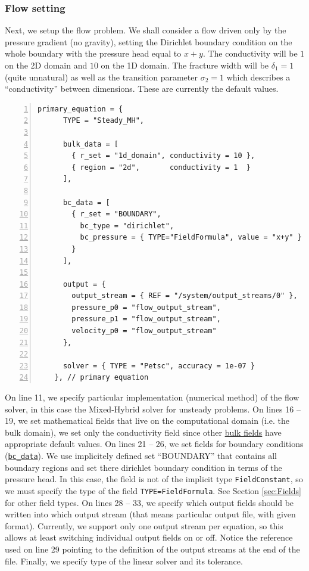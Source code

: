 \documentclass[12pt,a4paper]{report}
\begin{document}
\subsubsection{Flow setting}
Next, we setup the flow problem. We shall consider a flow driven only by the pressure gradient (no gravity),
setting the Dirichlet boundary condition on the whole boundary with the pressure head equal to $x+y$. 
The conductivity will be $1$ on the 2D domain and $10$ on the 1D domain.
The fracture width will be $\delta_1=1$ (quite unnatural) as well as the transition parameter 
$\sigma_2 = 1$ which describes a ``conductivity'' between dimensions. 
These are currently the default values.

\begin{Verbatim}[numbers=left, firstnumber=last]
    primary_equation = {
      TYPE = "Steady_MH", 

      bulk_data = [
        { r_set = "1d_domain", conductivity = 10 },
        { region = "2d",       conductivity = 1  }
      ],
      
      bc_data = [
        { r_set = "BOUNDARY",
          bc_type = "dirichlet",
          bc_pressure = { TYPE="FieldFormula", value = "x+y" }
        }
      ],

      output = {
        output_stream = { REF = "/system/output_streams/0" }, 
        pressure_p0 = "flow_output_stream", 
        pressure_p1 = "flow_output_stream", 
        velocity_p0 = "flow_output_stream"
      }, 
      
      solver = { TYPE = "Petsc", accuracy = 1e-07 }
    }, // primary equation
\end{Verbatim}
On line 11, we specify particular implementation (numerical method) of the flow solver, in this case the Mixed-Hybrid
solver for unsteady problems. On lines 16 -- 19, we set mathematical fields that live on the computational domain 
(i.e. the bulk domain), we set only the conductivity field since other \hyperlink{IT::DarcyFlowMH-Steady-BulkData}{bulk fields} have appropriate default values.
On lines 21 -- 26, we set fields for boundary conditions (\hyperlink{IT::DarcyFlowMH-Steady-BulkData}{{\tt bc\_data}}). 
We use implicitely defined set ``BOUNDARY'' that contains all boundary regions and set there dirichlet boundary condition in terms of the 
pressure head. In this case, the field is not of the implicit type {\tt FieldConstant}, so we must specify the type of the field {\tt TYPE=FieldFormula}.
See Section \ref{sec:Fields} for other field types. 
On lines 28 -- 33, we specify which output fields should be written into which output stream (that means particular output file, with given format).
Currently, we support only one output stream per equation, so this allows at least switching individual output fields on or off. 
Notice the reference used on line 29 pointing to the definition of the output streams at the end of the file. Finally, we specify type of the linear solver and its tolerance.
\end{document}
